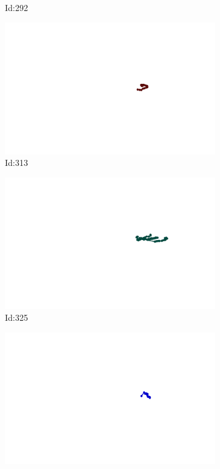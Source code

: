 \documentclass[12pt,twoside]{report}
\begin{document}
\begin{figure}
\begin{subfigure}[b]{0.20\textwidth}
\caption{Id:292}
\end{subfigure}
\begin{subfigure}[b]{0.20\textwidth}
\centering
\includegraphics[width=\textwidth]{../trajectories/313.png}
\caption{Id:313}
\end{subfigure}
\begin{subfigure}[b]{0.20\textwidth}
\centering
\includegraphics[width=\textwidth]{../trajectories/325.png}
\caption{Id:325}
\end{subfigure}
\begin{subfigure}[b]{0.20\textwidth}
\centering
\includegraphics[width=\textwidth]{../trajectories/333.png}

\end{subfigure}
\end{figure}
\end{document}
